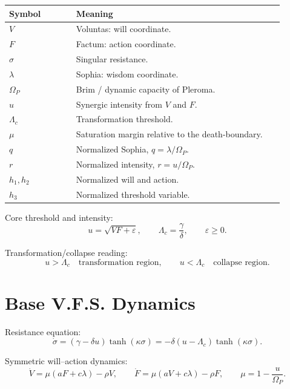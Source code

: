 \documentclass[11pt,a4paper]{article}
\newcommand{\Om}{\Omega_P}
\theoremstyle{plain}
\theoremstyle{definition}
\theoremstyle{remark}
\begin{document}
\begin{longtable}{>{\raggedright\arraybackslash}p{0.22\linewidth} >{\raggedright\arraybackslash}p{0.68\linewidth}}
\toprule
Symbol & Meaning \\
\midrule
$V$ & Voluntas: will coordinate. \\
$F$ & Factum: action coordinate. \\
$\sigma$ & Singular resistance. \\
$\lambda$ & Sophia: wisdom coordinate. \\
$\Om$ & Brim / dynamic capacity of Pleroma. \\
$u$ & Synergic intensity from $V$ and $F$. \\
$\Lambda_c$ & Transformation threshold. \\
$\mu$ & Saturation margin relative to the death-boundary. \\
$q$ & Normalized Sophia, $q=\lambda/\Om$. \\
$r$ & Normalized intensity, $r=u/\Om$. \\
$h_1,h_2$ & Normalized will and action. \\
$h_3$ & Normalized threshold variable. \\
\bottomrule
\end{longtable}

Core threshold and intensity:
\begin{equation}
  u=\sqrt{VF+\varepsilon},\qquad
  \Lambda_c=\frac{\gamma}{\delta},\qquad
  \varepsilon\ge 0.
\end{equation}

Transformation/collapse reading:
\begin{equation}
  u>\Lambda_c\quad\text{transformation region},
  \qquad
  u<\Lambda_c\quad\text{collapse region}.
\end{equation}

\section{Base V.F.S. Dynamics}

Resistance equation:
\begin{equation}
  \dot\sigma=(\gamma-\delta u)\tanh(\kappa\sigma)
  =-\delta(u-\Lambda_c)\tanh(\kappa\sigma).
\end{equation}

Symmetric will--action dynamics:
\begin{equation}
  \dot V=\mu(aF+c\lambda)-\rho V,
  \qquad
  \dot F=\mu(aV+c\lambda)-\rho F,
  \qquad
  \mu=1-\frac{u}{\Om}.
\end{equation}
\end{document}
